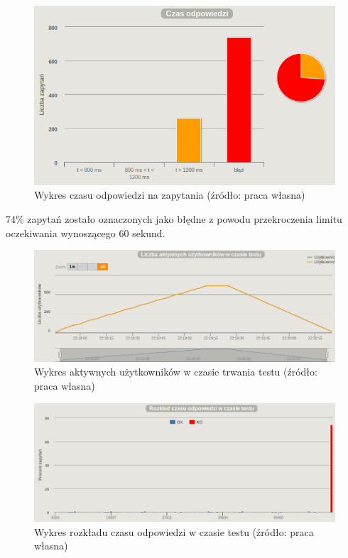 \documentclass[12pt,twoside]{article}
\begin{document}
\begin{figure}[htbp]
\centering
\includegraphics[resolution=150]{test_results/java/fibonacci/screenshots/response_times.png}
\caption{Wykres czasu odpowiedzi na zapytania (źródło: praca własna)}
\end{figure}

74\% zapytań zostało oznaczonych jako błędne z powodu przekroczenia
limitu oczekiwania wynoszącego 60 sekund.

\begin{figure}[htbp]
\centering
\includegraphics[resolution=150]{test_results/java/fibonacci/screenshots/active_users.png}
\caption{Wykres aktywnych użytkowników w czasie trwania testu (źródło: praca własna)}
\end{figure}

\begin{figure}[htbp]
\centering
\includegraphics[resolution=150]{test_results/java/fibonacci/screenshots/distribution.png}
\caption{Wykres rozkładu czasu odpowiedzi w czasie testu (źródło: praca własna)}
\end{figure}
\end{document}

